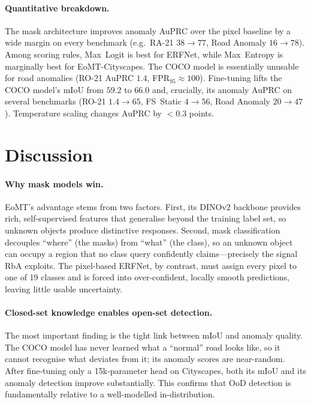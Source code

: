 \documentclass[10pt,twocolumn]{article}
\begin{document}
\paragraph{Quantitative breakdown.}
The mask architecture improves anomaly AuPRC over the pixel baseline by a wide
margin on every benchmark (e.g.\ RA-21 $38\!\rightarrow\!77$, Road Anomaly
$16\!\rightarrow\!78$). Among scoring rules, Max~Logit is best for ERFNet, while
Max~Entropy is marginally best for EoMT-Cityscapes. The COCO model is essentially
unusable for road anomalies (RO-21 AuPRC $1.4$, FPR$_{95}\approx100$).
Fine-tuning lifts the COCO model's mIoU from $59.2$ to $66.0$ and, crucially,
its anomaly AuPRC on several benchmarks (RO-21 $1.4\!\rightarrow\!65$, FS~Static
$4\!\rightarrow\!56$, Road Anomaly $20\!\rightarrow\!47$). Temperature scaling
changes AuPRC by $<\!0.3$ points.

\section{Discussion}

\paragraph{Why mask models win.}
EoMT's advantage stems from two factors. First, its DINOv2 backbone provides
rich, self-supervised features that generalise beyond the training label set,
so unknown objects produce distinctive responses. Second, mask classification
decouples ``where'' (the masks) from ``what'' (the class), so an unknown object
can occupy a region that no class query confidently claims---precisely the
signal RbA exploits. The pixel-based ERFNet, by contrast, must assign every
pixel to one of 19 classes and is forced into over-confident, locally smooth
predictions, leaving little usable uncertainty.

\paragraph{Closed-set knowledge enables open-set detection.}
The most important finding is the tight link between mIoU and anomaly quality.
The COCO model has never learned what a ``normal'' road looks like, so it cannot
recognise what deviates from it; its anomaly scores are near-random. After
fine-tuning only a 15k-parameter head on Cityscapes, both its mIoU and its
anomaly detection improve substantially. This confirms that OoD detection is
fundamentally relative to a well-modelled in-distribution.
\end{document}
